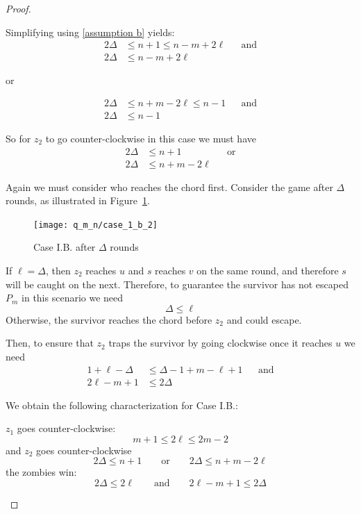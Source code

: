 \begin{proof}
\begin{proofpart}
\begin{itemize}
  Simplifying using \ref{assumption b} yields:
  \begin{align*}
   2 \Delta &\leq n+1 \leq n-m+2\ell && \text{and} \\
   2 \Delta &\leq n - m + 2\ell
  \end{align*}
  \begin{center}or\end{center}
  \begin{align*}
   2 \Delta &\leq n+m -2 \ell \leq n-1 && \text{and} \\
   2 \Delta &\leq n -1
  \end{align*}

  So for $z_2$ to go counter-clockwise in this case we must have
  \begin{align*}
   2 \Delta &\leq n + 1         && \text{or} \\
   2 \Delta &\leq n + m - 2\ell
  \end{align*}

  Again we must consider who reaches the chord first. Consider the game after $\Delta$ rounds, as illustrated in Figure~\ref{fig:case_1_b_2}.

  \begin{figure}
    \centering
    \texttt{[image: q\_m\_n/case\_1\_b\_2]}
    \caption{Case I.B. after $\Delta$ rounds \label{fig:case_1_b_2}}
  \end{figure}

  If $\ell = \Delta$, then $z_2$ reaches $u$ and $s$ reaches $v$ on the same round, and therefore $s$ will be caught on the next. Therefore, to guarantee the survivor has not escaped $P_m$ in this scenario we need
  \[ \Delta \leq \ell\]
  Otherwise, the survivor reaches the chord before $z_2$ and could escape.

  Then, to ensure that $z_2$ traps the survivor by going clockwise once
  it reaches $u$ we need
  \begin{align*}
   1 + \ell - \Delta &\leq \Delta -1 + m - \ell + 1 && \text{and} \\
   2\ell - m + 1 &\leq 2 \Delta
  \end{align*}

  We obtain the following characterization for Case I.B.:

  $z_1$ goes counter-clockwise:
  \[ m + 1 \leq 2 \ell \leq 2m - 2\]
  and $z_2$ goes counter-clockwise
  \[ 2 \Delta \leq n + 1 \qquad \text{or} \qquad 2 \Delta \leq n + m - 2\ell \]
  the zombies win:
  \[ 2 \Delta \leq 2 \ell \qquad \text{and} \qquad 2\ell - m + 1 \leq 2 \Delta \]


\end{itemize}
\end{proofpart}
\end{proof}
